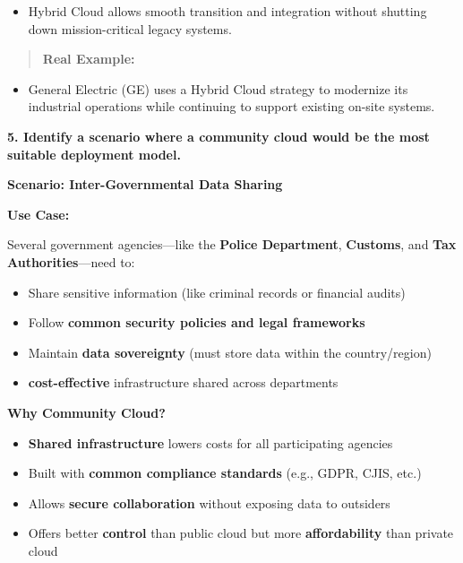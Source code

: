 \documentclass[12pt]{article}
\begin{document}
\begin{itemize}
\item
  Hybrid Cloud allows smooth transition and integration without shutting
  down mission-critical legacy systems.
\end{itemize}

\begin{quote}
\textbf{Real Example:}
\end{quote}

\begin{itemize}
\item
  General Electric (GE) uses a Hybrid Cloud strategy to modernize its
  industrial operations while continuing to support existing on-site
  systems.
\end{itemize}

\textbf{5. Identify a scenario where a community cloud would be the most
suitable deployment model.}

\textbf{Scenario: Inter-Governmental Data Sharing}

\textbf{Use Case:}

Several government agencies---like the \textbf{Police Department},
\textbf{Customs}, and \textbf{Tax Authorities}---need to:

\begin{itemize}
\item
  Share sensitive information (like criminal records or financial
  audits)
\item
  Follow \textbf{common security policies and legal frameworks}
\item
  Maintain \textbf{data sovereignty} (must store data within the
  country/region)
\item
  \textbf{cost-effective} infrastructure shared across departments
\end{itemize}

\textbf{Why Community Cloud?}

\begin{itemize}
\item
  \textbf{Shared infrastructure} lowers costs for all participating
  agencies
\item
  Built with \textbf{common compliance standards} (e.g., GDPR, CJIS,
  etc.)
\item
  Allows \textbf{secure collaboration} without exposing data to
  outsiders
\item
  Offers better \textbf{control} than public cloud but more
  \textbf{affordability} than private cloud
\end{itemize}
\end{document}
